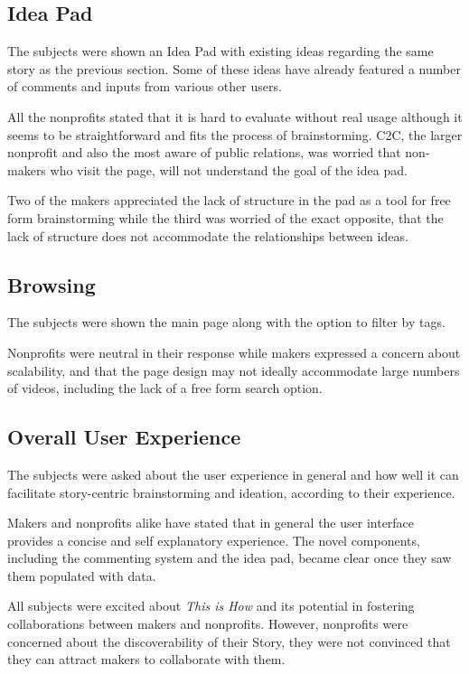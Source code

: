 \subsection{Idea Pad}

The subjects were shown an Idea Pad with existing ideas regarding the same story as the previous section. Some of these ideas have already featured a number of comments and inputs from various other users.

All the nonprofits stated that it is hard to evaluate without real usage although it seems to be straightforward and fits the process of brainstorming. C2C, the larger nonprofit and also the most aware of public relations, was worried that non-makers who visit the page, will not understand the goal of the idea pad.   

Two of the makers appreciated the lack of structure in the pad as a tool for free form brainstorming while the third was worried of the exact opposite, that the lack of structure does not accommodate the relationships between ideas.

\subsection{Browsing}

The subjects were shown the main page along with the option to filter by tags.

Nonprofits were neutral in their response while makers expressed a concern about scalability, and that the page design may not ideally accommodate large numbers of videos, including the lack of a free form search option.

\subsection{Overall User Experience}
The subjects were asked about the user experience in general and how well it can facilitate story-centric brainstorming and ideation, according to their experience.  

Makers and nonprofits alike have stated that in general the user interface provides a concise and self explanatory experience. The novel components, including the commenting system and the idea pad, became clear once they saw them populated with data.     

All subjects were excited about \textit{This is How} and its potential in fostering collaborations between makers and nonprofits. However, nonprofits were concerned about the discoverability of their Story, they were not convinced that they can attract makers to collaborate with them.     

